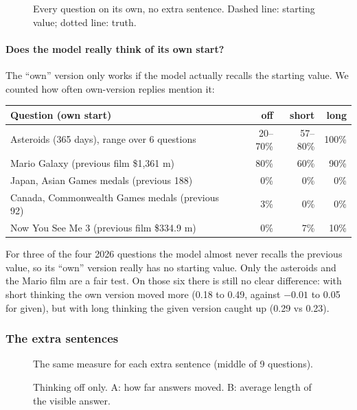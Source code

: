 \documentclass[11pt,a4paper]{article}
\begin{document}
\begin{figure}[ht]
\centering{}
\caption{Every question on its own, no extra sentence. Dashed line: starting value; dotted line: truth.}
\label{e5:fig:items}
\end{figure}

\paragraph{Does the model really think of its own start?} The \enquote{own} version only works if the model actually recalls the starting value. We counted how often own-version replies mention it:

\begin{center}\small
\begin{tabular}{@{}lrrr@{}}
\toprule
Question (own start) & off & short & long \\
\midrule
Asteroids (365 days), range over 6 questions & 20--70\% & 57--80\% & 100\% \\
Mario Galaxy (previous film \$1,361 m) & 80\% & 60\% & 90\% \\
Japan, Asian Games medals (previous 188) & 0\% & 0\% & 0\% \\
Canada, Commonwealth Games medals (previous 92) & 3\% & 0\% & 0\% \\
Now You See Me 3 (previous film \$334.9 m) & 0\% & 7\% & 10\% \\
\bottomrule
\end{tabular}
\end{center}

For three of the four 2026 questions the model almost never recalls the previous value, so its \enquote{own} version really has no starting value. Only the asteroids and the Mario film are a fair test. On those six there is still no clear difference: with short thinking the own version moved more (0.18 to 0.49, against $-0.01$ to 0.05 for given), but with long thinking the given version caught up (0.29 vs 0.23).

\subsubsection{The extra sentences}
\begin{figure}[ht]
\centering{}
\caption{The same measure for each extra sentence (middle of 9 questions).}
\label{e5:fig:instr}
\end{figure}

\begin{figure}[ht]
\centering{}
\caption{Thinking off only. A: how far answers moved. B: average length of the visible answer.}
\label{e5:fig:off}
\end{figure}
\end{document}
